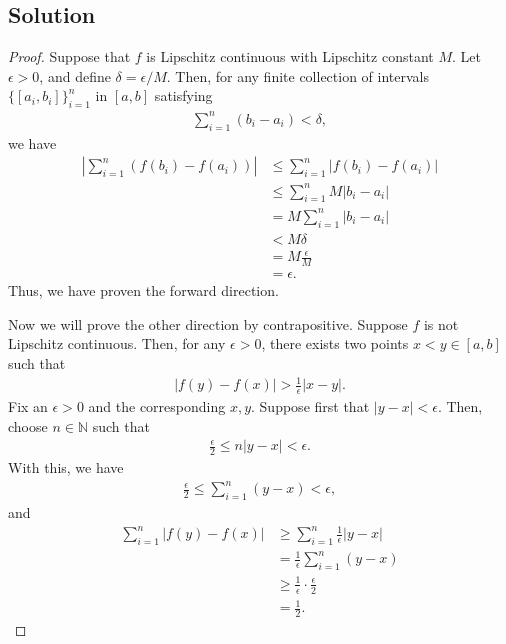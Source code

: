 \documentclass[10pt,a4paper]{article}
\theoremstyle{theorem}
\theoremstyle{definition}
\begin{document}
\subsection*{Solution}
\begin{proof}
Suppose that $f$ is Lipschitz continuous with Lipschitz constant $M$. Let $\epsilon > 0$, and define $\delta = \epsilon / M$. Then, for any finite collection of intervals $\{[a_i, b_i] \}_{i=1}^n$ in $[a, b]$ satisfying 
\begin{align*}
\sum_{i=1}^n (b_i - a_i) < \delta,
\end{align*}
we have
\begin{align*}
\left|\sum_{i=1}^n (f(b_i) - f(a_i))\right| &\leq \sum_{i=1}^n |f(b_i) - f(a_i)|\\
&\leq \sum_{i=1}^n M|b_i - a_i|\\
&= M \sum_{i=1}^n |b_i - a_i|\\
&< M \delta\\
&= M \frac{\epsilon}{M}\\
&= \epsilon.
\end{align*}
Thus, we have proven the forward direction.

Now we will prove the other direction by contrapositive. Suppose $f$ is not Lipschitz continuous. Then, for any $\epsilon > 0$, there exists two points $x < y \in [a, b]$ such that 
\begin{align*}
|f(y) - f(x)| > \frac{1}{\epsilon}|x - y|.
\end{align*}
Fix an $\epsilon > 0$ and the corresponding $x,y$. Suppose first that $|y - x| < \epsilon$. Then, choose $n \in \mathbb{N}$ such that 
\begin{align*}
\frac{\epsilon}{2} \leq n |y - x| < \epsilon.
\end{align*}
With this, we have
\begin{align*}
\frac{\epsilon}{2} \leq \sum_{i=1}^n (y - x) < \epsilon,
\end{align*}
and
\begin{align*}
\sum_{i=1}^n |f(y) - f(x)| &\geq \sum_{i=1}^n \frac{1}{\epsilon}|y - x|\\
&= \frac{1}{\epsilon} \sum_{i=1}^n (y - x)\\
&\geq \frac{1}{\epsilon} \cdot \frac{\epsilon}{2}\\
&= \frac{1}{2}.
\end{align*}


\end{proof}
\end{document}

